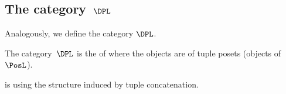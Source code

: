 
\subsection{The category~$\DPL$}

Analogously, we define the category $\DPL$.

\begin{definition}\label{def:DPL}
    The category~$\DPL$ is the  of \DP where the objects are  of tuple posets (objects of $\PosL$).
\end{definition}
\begin{lemma}
    \DPL is  using the structure induced by tuple concatenation.
\end{lemma}
